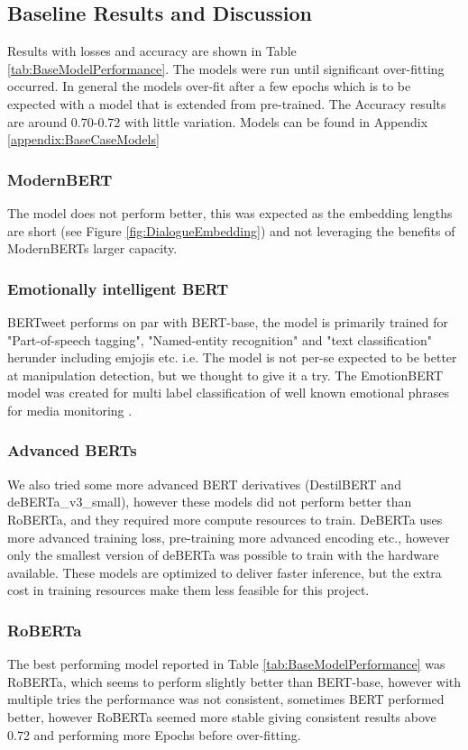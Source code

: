 \documentclass[
	letterpaper, %
	12pt, %
	unnumberedsections, %
	twoside, %
]{LTJournalArticle}
\begin{document}
\subsection{Baseline Results and Discussion}\label{sec:BaselineResults}
Results with losses and accuracy are shown in Table \ref{tab:BaseModelPerformance}. The models were run until significant over-fitting occurred. In general the models over-fit after a few epochs which is to be expected with a model that is extended from pre-trained. The Accuracy results are around 0.70-0.72 with little variation. Models can be found in Appendix \ref{appendix:BaseCaseModels}

\subsubsection{ModernBERT} The model does not perform better, this was expected as the embedding lengths are short (see Figure \ref{fig:DialogueEmbedding}) and not leveraging the benefits of ModernBERTs larger capacity.

\subsubsection{Emotionally intelligent BERT}
BERTweet performs on par with BERT-base, the model is primarily trained for "Part-of-speech tagging", "Named-entity recognition" and "text classification" \cite{BERTweet} herunder including emjojis etc. i.e. The model is not per-se expected to be better at manipulation detection, but we thought to give it a try. The EmotionBERT model was created for multi label classification of well known emotional phrases for media monitoring \cite{EmotionBERT}.

\subsubsection{Advanced BERTs}
We also tried some more advanced BERT derivatives (DestilBERT and deBERTa\_v3\_small), however these models did not perform better than RoBERTa, and they required more compute resources to train. DeBERTa uses more advanced training loss, pre-training more advanced encoding etc.\cite{DeBERTaV3}, however only the smallest version of deBERTa was possible to train with the hardware available. These models are optimized to deliver faster inference, but the extra cost in training resources make them less feasible for this project.
\subsubsection{RoBERTa}
The best performing model reported in Table \ref{tab:BaseModelPerformance} was RoBERTa, which seems to perform slightly better than BERT-base, however with multiple tries the performance was not consistent, sometimes BERT performed better, however RoBERTa seemed more stable giving consistent results above 0.72 and performing more Epochs before over-fitting.
\end{document}
